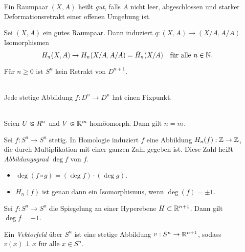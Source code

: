 \documentclass{cheat-sheet}
\newcommand{\RH}{\tilde{H}} %
\begin{document}
\begin{defn}
  Ein Raumpaar $(X, A)$ heißt \emph{gut}, falls $A$ nicht leer, abgeschlossen und starker Deformationsretrakt einer offenen Umgebung ist.
\end{defn}

\begin{prop}
  Sei $(X, A)$ ein gutes Raumpaar. Dann induziert $q : (X, A) \to (X/A, A/A)$ Isomorphismen
  \[ H_n(X, A) \to H_n(X/A, A/A) = \RH_n(X/A) \quad \text{für alle $n \in \N$.} \]
\end{prop}

\begin{satz}
  Für $n \geq 0$ ist $S^n$ kein Retrakt von $D^{n+1}$.
\end{satz}

\begin{kor}\mbox{}\\
  Jede stetige Abbildung $f : D^n \to D^n$ hat einen Fixpunkt.
\end{kor}

\begin{satz}\mbox{}\\
  Seien $U \opn R^n$ und $V \opn \R^m$ homöomorph. Dann gilt $n = m$.
\end{satz}


\begin{defn}
  Sei $f : S^n \to S^n$ stetig. In Homologie induziert $f$ eine Abbildung $H_n(f) : \mathbb{Z} \to \mathbb{Z}$, die durch Multiplikation mit einer ganzen Zahl gegeben ist. Diese Zahl heißt \emph{Abbildungsgrad} $\deg f$ von $f$.
\end{defn}

\begin{lem}
  \begin{itemize}
    \item $\deg (f \circ g) = (\deg f) \cdot (\deg g)$.
    \item $H_n(f)$ ist genau dann ein Isomorphismus, wenn $\deg(f) = \pm 1$.
  \end{itemize}
\end{lem}

\begin{prop}
  Sei $f : S^n \to S^n$ die Spiegelung an einer Hyperebene $H \subset \mathbb{R}^{n+1}$. Dann gilt $\deg f = -1$.
\end{prop}

\begin{defn}
  Ein \emph{Vektorfeld} über $S^n$ ist eine stetige Abbildung $v : S^n \to \mathbb{R}^{n+1}$, sodass $v(x) \perp x$ für alle $x \in S^n$.
\end{defn}
\end{document}
